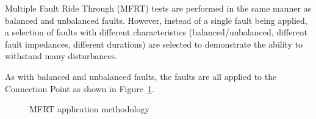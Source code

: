 Multiple Fault Ride Through (MFRT) tests are performed in the same manner as balanced and unbalanced faults. However, instead of a single fault being applied, a selection of faults with different characteristics (balanced/unbalanced, different fault impedances, different durations) are selected to demonstrate the ability to withstand many disturbances.

As with balanced and unbalanced faults, the faults are all applied to the Connection Point as shown in Figure~\ref{fig:mfrt-diagram}.

\begin{figure}[h]
	\centering
	
	\caption{MFRT application methodology}
	\label{fig:mfrt-diagram}
\end{figure}